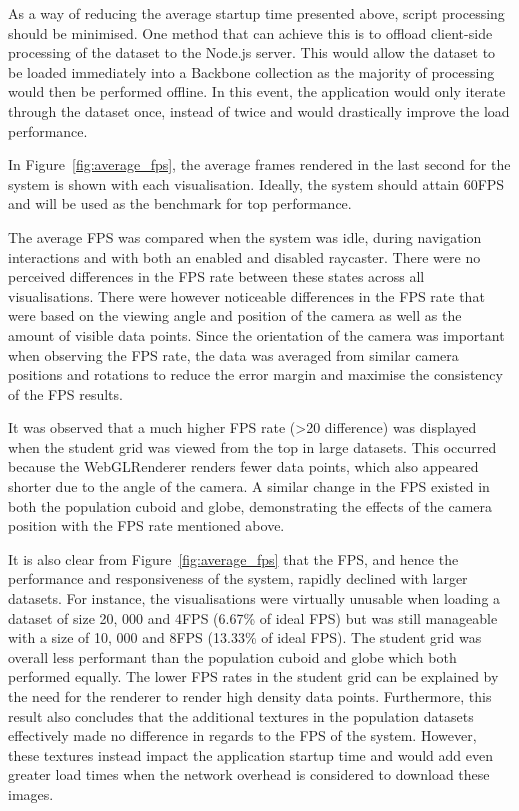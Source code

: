 {{		

		As a way of reducing the average startup time presented above, script processing should be minimised. One method that can achieve this is to offload client-side processing of the dataset to the Node.js server. This would allow the dataset to be loaded immediately into a Backbone collection as the majority of processing would then be performed offline. In this event, the application would only iterate through the dataset once, instead of twice and would drastically improve the load performance. 


		In Figure~\ref{fig:average_fps}, the average frames rendered in the last second for the system is shown with each visualisation. Ideally, the system should attain 60FPS and will be used as the benchmark for top performance.

		

		The average FPS was compared when the system was idle, during navigation interactions and with both an enabled and disabled raycaster. There were no perceived differences in the FPS rate between these states across all visualisations. There were however noticeable differences in the FPS rate that were based on the viewing angle and position of the camera as well as the amount of visible data points. Since the orientation of the camera was important when observing the FPS rate, the data was averaged from similar camera positions and rotations to reduce the error margin and maximise the consistency of the FPS results. 

		It was observed that a much higher FPS rate (\textgreater20 difference) was displayed when the student grid was viewed from the top in large datasets. This occurred because the WebGLRenderer renders fewer data points, which also appeared shorter due to the angle of the camera. A similar change in the FPS existed in both the population cuboid and globe, demonstrating the effects of the camera position with the FPS rate mentioned above. 

		It is also clear from Figure~\ref{fig:average_fps} that the FPS, and hence the performance and responsiveness of the system, rapidly declined with larger datasets. For instance, the visualisations were virtually unusable when loading a dataset of size 20, 000 and 4FPS (6.67\% of ideal FPS) but was still manageable with a size of 10, 000 and 8FPS (13.33\% of ideal FPS). The student grid was overall less performant than the population cuboid and globe which both performed equally. The lower FPS rates in the student grid can be explained by the need for the renderer to render high density data points. Furthermore, this result also concludes that the additional textures in the population datasets effectively made no difference in regards to the FPS of the system. However, these textures instead impact the application startup time and would add even greater load times when the network overhead is considered to download these images.

}}

